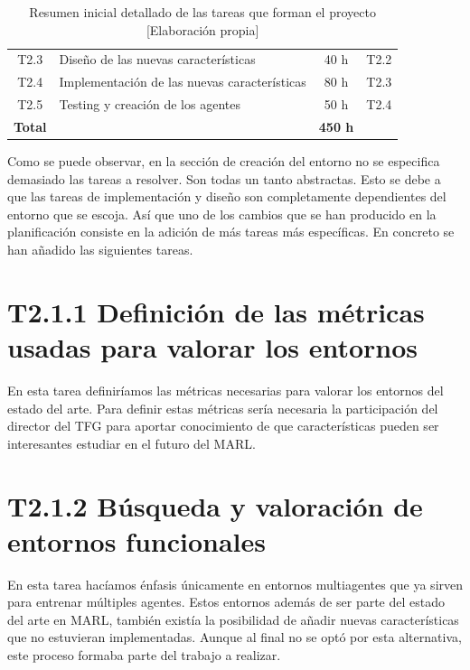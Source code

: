 \begin{table}[h]
\begin{center}
\begin{tabular}{| c | l | c | c |}
			T2.3            & Diseño de las nuevas características         & 40 h            & T2.2                 \\
			T2.4            & Implementación de las nuevas características & 80 h            & T2.3                 \\
			T2.5            & Testing y creación de los agentes            & 50 h            & T2.4                 \\
			\hline
			\textbf{Total}  &                                              & \textbf{450 h}  &                      \\
			\hline
		\end{tabular}
		\caption{Resumen inicial detallado de las tareas que forman el proyecto [Elaboración propia]}
		\label{tab:planificacion}
	\end{center}
\end{table}

Como se puede observar, en la sección de creación del entorno no se especifica demasiado las tareas a resolver. Son todas un tanto abstractas. Esto se debe a que las tareas de implementación y diseño son completamente dependientes del entorno que se escoja. Así que uno de los cambios que se han producido en la planificación consiste en la adición de más tareas más específicas. En concreto se han añadido las siguientes tareas.  

\section*{T2.1.1 Definición de las métricas usadas para valorar los entornos}
En esta tarea definiríamos las métricas necesarias para valorar los entornos del estado del arte. Para definir estas métricas sería necesaria la participación del director del TFG para aportar conocimiento de que características pueden ser interesantes estudiar en el futuro del MARL.

\section*{T2.1.2 Búsqueda y valoración de entornos funcionales}
En esta tarea hacíamos énfasis únicamente en entornos multiagentes que ya sirven para entrenar múltiples agentes. Estos entornos además de ser parte del estado del arte en MARL, también existía la posibilidad de añadir nuevas características que no estuvieran implementadas. Aunque al final no se optó por esta alternativa, este proceso formaba parte del trabajo a realizar.

